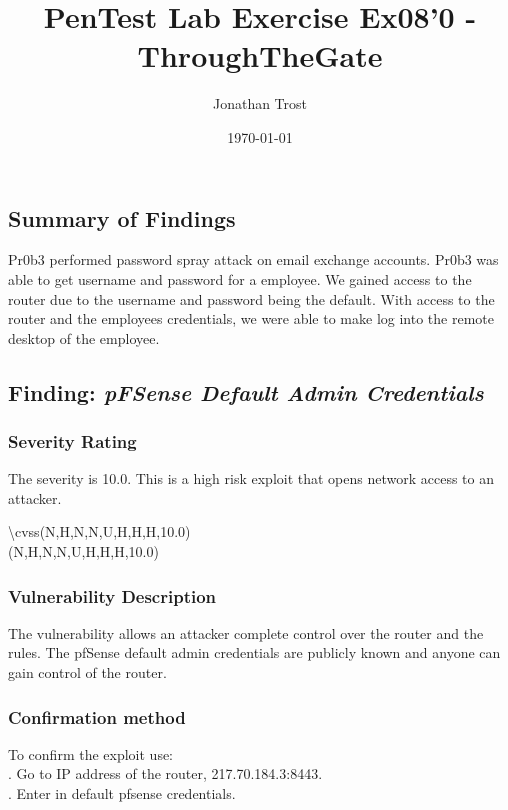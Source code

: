 \documentclass[notitlepage]{article}
\begin{document}
	
	
	\title{PenTest Lab Exercise Ex08'0 - ThroughTheGate}
	\author{Jonathan Trost}
	\date{\isodate\today}
	
	\maketitle
	
	\tableofcontents
	
	\newpage
	
	\subsection{Summary of Findings}
	\indent Pr0b3 performed password spray attack on email exchange accounts.  Pr0b3 was able to get username and password for a employee.  We gained access to the router due to the username and password being the default.  With access to the router and the employees credentials, we were able to make log into the remote desktop of the employee. 
	
	\subsection{Finding: \emph{pFSense Default Admin Credentials}}
	
	\subsubsection{Severity Rating}
	\indent The severity is 10.0. This is a high risk exploit that opens network access to an attacker. 

	\textbackslash cvss(N,H,N,N,U,H,H,H,10.0)\\
	\cvss(N,H,N,N,U,H,H,H,10.0) \\
	
	\subsubsection{Vulnerability Description}
	\indent The vulnerability allows an attacker complete control over the router and the rules.  The pfSense default admin credentials are publicly known and anyone can gain control of the router.
	
	\subsubsection{Confirmation method}
	To confirm the exploit use: \\
	. Go to IP address of the router, 217.70.184.3:8443.\\
	. Enter in default pfsense credentials.\\
	
\end{document}
